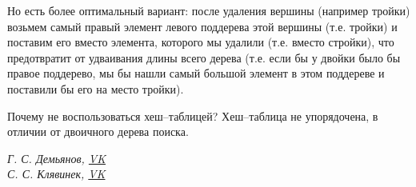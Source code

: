 \documentclass[a4paper,12pt]{article}
\theoremstyle{plain} %
\theoremstyle{definition} %
\theoremstyle{remark} %
\begin{document}
Но есть более оптимальный вариант: после удаления вершины (например тройки) возьмем самый правый элемент левого поддерева этой вершины (т.е. тройки) и поставим его вместо элемента, которого мы удалили (т.е. вместо стройки), что предотвратит от удваивания длины всего дерева (т.е. если бы у двойки было бы правое поддерево, мы бы нашли самый большой элемент в этом поддереве и поставили бы его на место тройки).

Почему не воспользоваться хеш--таблицей? Хеш--таблица не упорядочена, в отличии от двоичного дерева поиска.













\begin{center}
	\vfill \emph{{\small Г. С. Демьянов, \href{https://vk.com/id37346992}{VK}\\
С. С. Клявинек, \href{https://vk.com/id85132547}{VK}
}}
\end{center}
\end{document}
